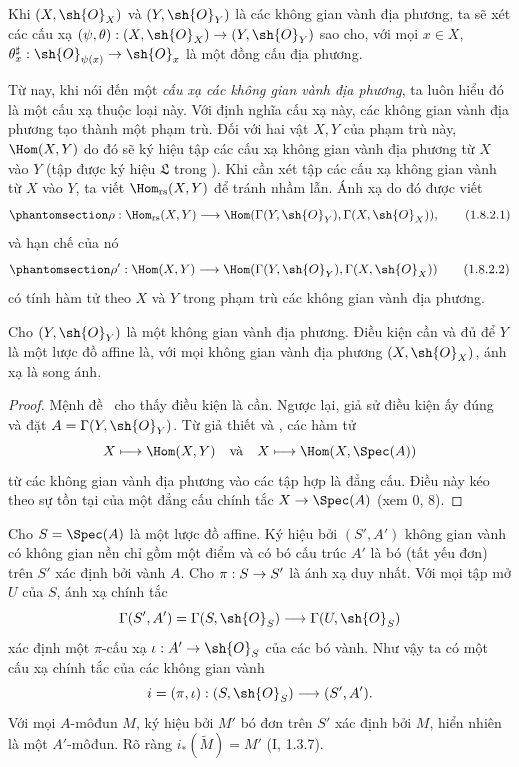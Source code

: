 \documentclass[oneside,10pt]{amsart}
\makeatletter
\newcommand{\ega@arrow}[2]{\mathchoice{#1}{#2}{#2}{#2}}
\renewcommand{\to}{\ega@arrow{\longrightarrow}{\rightarrow}}
\newcommand{\oldpage}[2][]{\marginnote{\normalfont\footnotesize\textbf{#1}~|~#2}\ignorespaces}
\let\EGAOriginalLabel\label
\renewcommand{\label}[1]{\phantomsection\EGAOriginalLabel{#1}}
\makeatother
\begin{document}
\begin{env}[1.8.2]
\label{ega2:addendum:I.1.8.2}
Khi $(X,\sh{O}_X)$ và $(Y,\sh{O}_Y)$ là các không gian vành địa
phương, ta sẽ xét các cấu xạ
$(\psi,\theta):(X,\sh{O}_X)\to(Y,\sh{O}_Y)$ sao cho, với mọi
$x\in X$, $\theta_x^\sharp:\sh{O}_{\psi(x)}\to\sh{O}_x$ là một đồng
cấu địa phương.

Từ nay, khi nói đến một
\oldpage[II]{219}
\emph{cấu xạ các không gian vành địa phương}, ta luôn hiểu đó là một
cấu xạ thuộc loại này. Với định nghĩa cấu xạ này, các không gian vành
địa phương tạo thành một phạm trù. Đối với hai vật $X,Y$ của phạm trù
này, $\Hom(X,Y)$ do đó sẽ ký hiệu tập các cấu xạ không gian vành địa
phương từ $X$ vào $Y$ (tập được ký hiệu $\mathfrak{L}$ trong
). Khi cần xét tập các cấu xạ không gian vành từ $X$ vào
$Y$, ta viết $\Hom_{\mathrm{rs}}(X,Y)$ để tránh nhầm lẫn. Ánh xạ
 do đó được viết
\begin{equation}
\label{ega2:addendum:I.1.8.2.1}
  \rho:\Hom_{\mathrm{rs}}(X,Y)
  \to\Hom(\Gamma(Y,\sh{O}_Y),\Gamma(X,\sh{O}_X)),
\tag{1.8.2.1}
\end{equation}
và hạn chế của nó
\begin{equation}
\label{ega2:addendum:I.1.8.2.2}
  \rho':\Hom(X,Y)
  \to\Hom(\Gamma(Y,\sh{O}_Y),\Gamma(X,\sh{O}_X))
\tag{1.8.2.2}
\end{equation}
có tính hàm tử theo $X$ và $Y$ trong phạm trù các không gian vành địa
phương.
\end{env}

\begin{corollary}[1.8.3]
\label{ega2:addendum:I.1.8.3}
Cho $(Y,\sh{O}_Y)$ là một không gian vành địa phương. Điều kiện cần và
đủ để $Y$ là một lược đồ affine là, với mọi không gian vành địa phương
$(X,\sh{O}_X)$, ánh xạ  là song ánh.
\end{corollary}

\begin{proof}
Mệnh đề~ cho thấy điều kiện là cần. Ngược lại, giả sử
điều kiện ấy đúng và đặt $A=\Gamma(Y,\sh{O}_Y)$. Từ giả thiết và
, các hàm tử
\[
  X\longmapsto\Hom(X,Y)
  \quad\hbox{và}\quad
  X\longmapsto\Hom(X,\Spec(A))
\]
từ các không gian vành địa phương vào các tập hợp là đẳng cấu. Điều
này kéo theo sự tồn tại của một đẳng cấu chính tắc
$X\to\Spec(A)$ (xem 0, 8).
\end{proof}

\begin{env}[1.8.4]
\label{ega2:addendum:I.1.8.4}
Cho $S=\Spec(A)$ là một lược đồ affine. Ký hiệu bởi $(S',A')$ không
gian vành có không gian nền chỉ gồm một điểm và có bó cấu trúc $A'$ là
bó (tất yếu đơn) trên $S'$ xác định bởi vành $A$. Cho
$\pi:S\to S'$ là ánh xạ duy nhất. Với mọi tập mở $U$ của $S$, ánh xạ
chính tắc
\[
  \Gamma(S',A')=\Gamma(S,\sh{O}_S)\to\Gamma(U,\sh{O}_S)
\]
xác định một $\pi$-cấu xạ $\iota:A'\to\sh{O}_S$ của các bó vành. Như
vậy ta có một cấu xạ chính tắc của các không gian vành
\[
  i=(\pi,\iota):(S,\sh{O}_S)\to(S',A').
\]
Với mọi $A$-môđun $M$, ký hiệu bởi $M'$ bó đơn trên $S'$ xác định bởi
$M$, hiển nhiên là một $A'$-môđun. Rõ ràng
$i_*(\widetilde M)=M'$ (I, 1.3.7).
\end{env}
\end{document}
